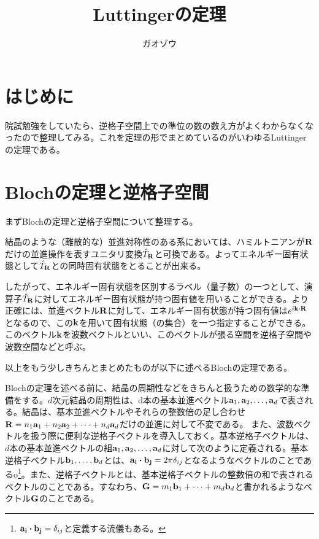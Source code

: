 \documentclass[uplatex,dvipdfmx]{jsarticle}
\title{Luttingerの定理}
\author{ガオゾウ}
\begin{document}
\maketitle

\section{はじめに}
    院試勉強をしていたら、逆格子空間上での準位の数の数え方がよくわからなくなったので整理してみる。これを定理の形でまとめているのがいわゆるLuttingerの定理である。

\section{Blochの定理と逆格子空間}
	まずBlochの定理と逆格子空間について整理する。
	
	結晶のような（離散的な）並進対称性のある系においては、ハミルトニアンが$\vb{R}$だけの並進操作を表すユニタリ変換$\hat{T}_{\vb{R}}$と可換である。よってエネルギー固有状態として$\hat{T}_{\vb{R}}$との同時固有状態をとることが出来る。

	したがって、エネルギー固有状態を区別するラベル（量子数）の一つとして、演算子$\hat{T}_{\vb{R}}$に対してエネルギー固有状態が持つ固有値を用いることができる。より正確には、並進ベクトル$\vb{R}$に対して、エネルギー固有状態が持つ固有値は$e^{i\vb{k}\vdot\vb{R}}$となるので、この$\vb{k}$を用いて固有状態（の集合）を一つ指定することができる。
	このベクトル$\vb{k}$を波数ベクトルといい、このベクトルが張る空間を逆格子空間や波数空間などと呼ぶ。

	以上をもう少しきちんとまとめたものが以下に述べるBlochの定理である。
	
	Blochの定理を述べる前に、結晶の周期性などをきちんと扱うための数学的な準備をする。$d$次元結晶の周期性は、d本の基本並進ベクトル$\vb{a}_1, \vb{a}_2, \dots , \vb{a}_d$で表される。結晶は、基本並進ベクトルやそれらの整数倍の足し合わせ$\vb{R} = n_1\vb{a}_1 + n_2\vb{a}_2 + \dots + n_d\vb{a}_d$だけの並進に対して不変である。
	また、波数ベクトルを扱う際に便利な逆格子ベクトルを導入しておく。基本逆格子ベクトルは、$d$本の基本並進ベクトルの組$\vb{a}_1, \vb{a}_2, \dots , \vb{a}_d$に対して次のように定義される。基本逆格子ベクトル$\vb{b}_1, \dots, \vb{b}_d$とは、$\vb{a_i}\vdot\vb{b_j} = 2\pi\delta_{ij}$となるようなベクトルのことであるo\footnote{$\vb{a_i}\vdot\vb{b_j} = \delta_{ij}$と定義する流儀もある。}。また、逆格子ベクトルとは、基本逆格子ベクトルの整数倍の和で表されるベクトルのことである。すなわち、$\vb{G} = m_1\vb{b}_1 + \dots + m_d\vb{b}_d$と書かれるようなベクトル$\vb{G}$のことである。
\end{document}
